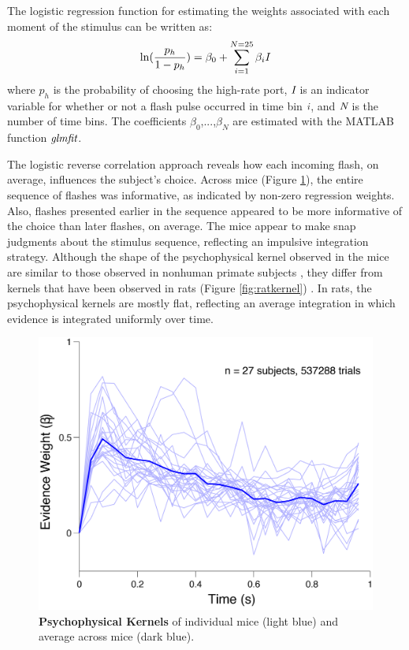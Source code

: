 The logistic regression function for estimating the weights associated with each moment of the stimulus can be written as:
\begin{equation}
	\centering
	\ln(\frac{p_h}{1-p_h}) = \beta_0 + \sum_{i=1}^{N=25} \beta_iI
\end{equation}
where $p_h$ is the probability of choosing the high-rate port, $\emph{I}$ is an indicator variable for whether or not a flash pulse occurred in time bin $\emph{i}$, and $\emph{N}$ is the number of time bins. The coefficients $\beta_0$,...,$\beta_N$ are estimated with the MATLAB function $\emph{glmfit}$. \par 
The logistic reverse correlation approach reveals how each incoming flash, on average, influences the subject's choice. Across mice (Figure \ref{fig:allkernels}), the entire sequence of flashes was informative, as indicated by non-zero regression weights. Also, flashes presented earlier in the sequence appeared to be more informative of the choice than later flashes, on average. The mice appear to make snap judgments about the stimulus sequence, reflecting an impulsive integration strategy. Although the shape of the psychophysical kernel observed in the mice are similar to those observed in nonhuman primate subjects \parencite{Katz2016}, they differ from kernels that have been observed in rats (Figure \ref{fig:ratkernel}) \parencite{Raposo2012,Brunton2013,Scott2015SourcesRats}. In rats, the psychophysical kernels are mostly flat, reflecting an average integration in which evidence is integrated uniformly over time. 
\begin{figure}
  \centering
  	\includegraphics[width=\textwidth]{Figures/chapter2/psychKernel_all_mice.png}
  \caption[Psychophysical Kernels ]{\textbf{Psychophysical Kernels} of individual mice (light blue) and average across mice (dark blue).}
   \label{fig:allkernels}
\end{figure}
